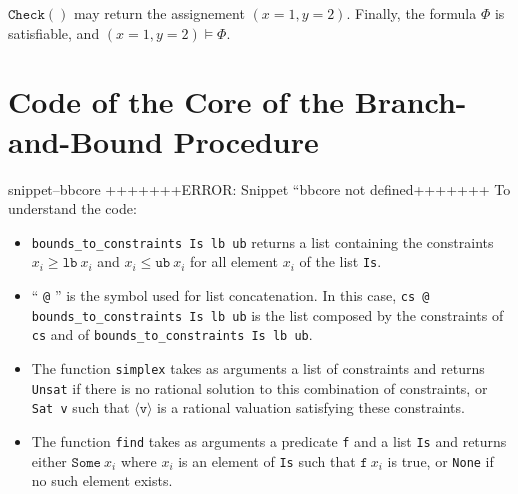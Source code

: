 \documentclass{article}
\newcommand{\icheck}{\mathtt{Check}()}
\newcommand{\Snippet}[1]{%
  \ifcsname snippet--#1\endcsname{\csname snippet--#1\endcsname}%
  \else+++++++ERROR: Snippet ``#1 not defined+++++++ \fi}
\begin{document}
$\icheck$ may return the assignement $(x=1, y=2)$. Finally, the formula $\Phi$
is satisfiable, and $(x=1, y=2) \vDash \Phi$.

\section{Code of the Core of the Branch-and-Bound Procedure}
\label{bbcode}

\Snippet{bbcore}
To understand the code:
\begin{itemize}
  \item \texttt{bounds\_to\_constraints Is lb ub} returns a list containing the
    constraints $x_i \geqslant \mathtt{lb}~x_i$ and
    $x_i \leqslant \mathtt{ub}~x_i$ for all element $x_i$ of the list
    \texttt{Is}.
  \item `` \texttt{@} '' is the symbol used for list concatenation. In this case,
    \linebreak \texttt{cs @ bounds\_to\_constraints Is lb ub} is the list
    composed by the constraints of \texttt{cs} and of
    \texttt{bounds\_to\_constraints~Is~lb~ub}.
  \item The function \texttt{simplex} takes as arguments a list of
    constraints and returns \texttt{Unsat} if there is no rational solution to
    this combination of constraints, or \texttt{Sat v} such that
    $\langle \mathtt{v} \rangle$ is a rational valuation satisfying these
    constraints.
  \item The function \texttt{find} takes as arguments a predicate \texttt{f}
    and a list \texttt{Is} and returns either $\mathtt{Some}~x_i$ where $x_i$ is
    an element of \texttt{Is} such that $\mathtt{f}~x_i$ is true, or
    \texttt{None} if no such element exists.
\end{itemize}
\end{document}

